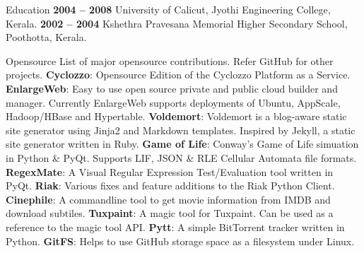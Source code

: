 \documentclass{resume}
\begin{document}



\begin{category}{Education}
   \hfill \textbf{2004 -- 2008}
  \citemnobullet University of Calicut, Jyothi Engineering College, Kerala.
   \hfill \textbf{2002 -- 2004}
  \citemnobullet Kshethra Pravesana Memorial Higher Secondary School, Poothotta, Kerala.
\end{category}


\begin{category}{Opensource}
  \citemnobullet List of major opensource contributions. Refer GitHub
  for other projects.
  \citembullet \textbf{Cyclozzo}: Opensource Edition of the Cyclozzo Platform as a Service.
  \citembullet \textbf{EnlargeWeb}: Easy to use open source private and public cloud builder and manager. 
  Currently EnlargeWeb supports deployments of Ubuntu, AppScale, Hadoop/HBase and Hypertable.
  \citembullet \textbf{Voldemort}: Voldemort is a blog-aware static site generator using Jinja2 
  and Markdown templates. Inspired by Jekyll, a static site generator written in Ruby.
  \citembullet \textbf{Game of Life}: Conway's Game of Life simuation in Python \& PyQt. Supports LIF, JSON \&
  RLE Cellular Automata file formats.
  \citembullet \textbf{RegexMate}: A Visual Regular Expression Test/Evaluation tool written in PyQt.
  \citembullet \textbf{Riak}: Various fixes and feature additions to
  the Riak Python Client.
  \citembullet \textbf{Cinephile}: A commandline tool to get
  movie information from IMDB and download subtiles.
  \citembullet \textbf{Tuxpaint}: A magic tool for Tuxpaint. Can be used as a reference to the magic tool API.
  \citembullet \textbf{Pytt}: A simple BitTorrent tracker written in Python.
  \citembullet \textbf{GitFS}: Helps to use GitHub storage space as a filesystem under Linux.
\end{category}
\end{document}
